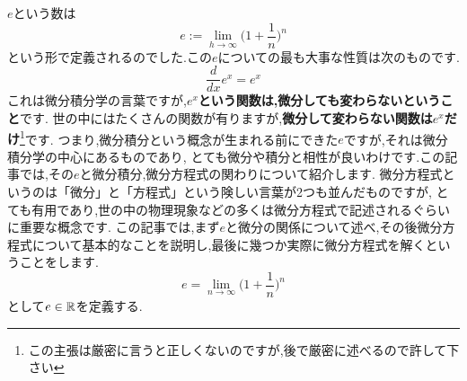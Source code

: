 $e$という数は
\[
e := \lim_{h \to \infty} \biggl( 1 + \frac{1}{n}\biggl)^n
\]
という形で定義されるのでした.この$e$についての最も大事な性質は次のものです.
\[
\frac{d}{dx} e^x = e^x
\]
これは微分積分学の言葉ですが,{\bf $e^x$という関数は,微分しても変わらないということ}です.
世の中にはたくさんの関数が有りますが,{\bf 微分して変わらない関数は$e^x$だけ}\footnote{この主張は厳密に言うと正しくないのですが,後で厳密に述べるので許して下さい}です.
つまり,微分積分という概念が生まれる前にできた$e$ですが,それは微分積分学の中心にあるものであり,
とても微分や積分と相性が良いわけです.この記事では,その$e$と微分積分,微分方程式の関わりについて紹介します.
微分方程式というのは「微分」と「方程式」という険しい言葉が2つも並んだものですが,
とても有用であり,世の中の物理現象などの多くは微分方程式で記述されるぐらいに重要な概念です.
この記事では,まず$e$と微分の関係について述べ,その後微分方程式について基本的なことを説明し,最後に幾つか実際に微分方程式を解くということをします.
\[
e = \lim_{n \to \infty} \biggl( 1 + \frac{1}{n}\biggl)^n
\]
として$e \in \mathbb R$を定義する.

